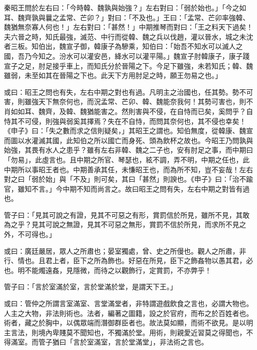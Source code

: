 \begin{pinyinscope}
秦昭王問於左右曰：「今時韓、魏孰與始強？」左右對曰：「弱於始也。」「今之如耳、魏齊孰與曩之孟常、芒卯？」對曰：「不及也。」王曰：「孟常、芒卯率強韓、魏猶無奈寡人何也！」左右對曰：「甚然！」中期推琴而對曰：「王之料天下過矣！夫六晉之時，知氏最強，滅范、中行而從韓、魏之兵以伐趙，灌以晉水，城之未沈者三板。知伯出，魏宣子御，韓康子為驂乘，知伯曰：「始吾不知水可以滅人之國，吾乃今知之。汾水可以灌安邑，絳水可以灌平陽。」魏宣子肘韓康子，康子踐宣子之足，肘足接乎車上，而知氏分於晉陽之下。今足下雖強，未若知氏；韓、魏雖弱，未至如其在晉陽之下也。此天下方用肘足之時，願王勿易之也。」


或曰：昭王之問也有失，左右中期之對也有過。凡明主之治國也，任其勢。勢不可害，則雖強天下無奈何也，而況孟常、芒卯、韓、魏能奈我何！其勢可害也，則不肖如如耳、魏齊，及韓、魏猶能害之。然則害與不侵，在自恃而已矣，奚問乎？自恃其不可侵，則強與弱奚其擇焉？失在不自恃，而問其奈何也，其不侵也幸矣！《申子》曰：「失之數而求之信則疑矣，」其昭王之謂也。知伯無度，從韓康、魏宣而圖以水灌滅其國，此知伯之所以國亡而身死、頭為飲杯之故也。今昭王乃問孰與始強，其畏有水人之患乎？雖有左右非韓、魏之二子也，安有肘足之事，而中期曰「勿易」，此虛言也。且中期之所官、琴瑟也，絃不調，弄不明，中期之任也，此中期所以事昭王者也。中期善承其任，未慊昭王也，而為所不知，豈不妄哉！左右對之曰「弱於始」與「不及」則可矣，其曰「甚然」則諛也。《申子》曰：「治不踰官，雖知不言。」今中期不知而尚言之。故曰昭王之問有失，左右中期之對皆有過也。


管子曰：「見其可說之有證，見其不可惡之有形，賞罰信於所見，雖所不見，其敢為之乎？見其可說之無證，見其不可惡之無形，賞罰不信於所見，而求所不見之外，不可得也。」


或曰：廣廷嚴居，眾人之所肅也；晏室獨處，曾、史之所僈也。觀人之所肅，非行、情也。且君上者，臣下之所為飾也。好惡在所見，臣下之飾姦物以愚其君，必也。明不能燭遠姦，見隱微，而待之以觀飾行，定賞罰，不亦弊乎！


管子曰：「言於室滿於室，言於堂滿於堂，是謂天下王。」


或曰：管仲之所謂言室滿室、言堂滿堂者，非特謂遊戲飲食之言也，必謂大物也。人主之大物，非法則術也。法者，編著之圖籍，設之於官府，而布之於百姓者也。術者，藏之於胸中，以偶眾端而潛御群臣者也。故法莫如顯，而術不欲見。是以明主言法，則境內卑賤莫不聞知也，不獨滿於堂。用術，則親愛近習莫之得聞也，不得滿室。而管子猶曰「言於室滿室，言於堂滿堂」，非法術之言也。

\end{pinyinscope}